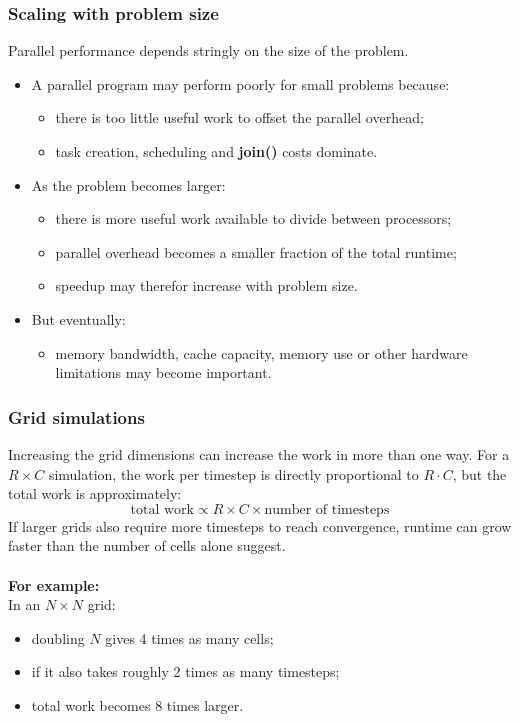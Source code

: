 \documentclass[11pt]{article}
\begin{document}
\subsubsection{Scaling with problem size}
Parallel performance depends stringly on the size of the problem.
\begin{itemize}
    \item A parallel program may perform poorly for small problems because:
    \begin{itemize}
        \item there is too little useful work to offset the parallel overhead;
        \item task creation, scheduling and \textbf{join()} costs dominate.
    \end{itemize}
    \item As the problem becomes larger:
    \begin{itemize}
        \item there is more useful work available to divide between processors;
        \item parallel overhead becomes a smaller fraction of the total runtime;
        \item speedup may therefor increase with problem size.
    \end{itemize}
    \item But eventually:
    \begin{itemize}
        \item memory bandwidth, cache capacity, memory use or other hardware limitations may become important.
    \end{itemize}
\end{itemize}
\subsubsection{Grid simulations}
Increasing the grid dimensions can increase the work in more than one way.
For a $R\times C$ simulation, the work per timestep is directly proportional to $R\cdot C$, but the total work is approximately:
$$
\boxed{\text{total work}\propto R\times C\times \text{number of timesteps}}
$$
If larger grids also require more timesteps to reach convergence, runtime can grow faster than the number of cells alone suggest.
\\\\
\textbf{For example:}\\
In an $N\times N$ grid:
\begin{itemize}
    \item doubling $N$ gives 4 times as many cells;
    \item if it also takes roughly 2 times as many timesteps;
    \item total work becomes 8 times larger.
\end{itemize}
\end{document}
